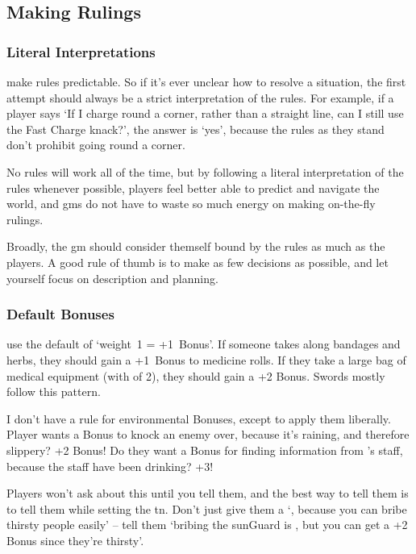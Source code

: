 \begin{multicols}{2}
\subsection{Making Rulings}

\subsubsection{Literal Interpretations}
make rules predictable.
So if it's ever unclear how to resolve a situation, the first attempt should always be a strict interpretation of the rules.
For example, if a player says `If I charge round a corner, rather than a straight line, can I still use the Fast Charge knack?', the answer is `yes', because the rules as they stand don't prohibit going round a corner.

No rules will work all of the time, but by following a literal interpretation of the rules whenever possible, players feel better able to predict and navigate the world, and \glspl{gm} do not have to waste so much energy on making on-the-fly rulings.

Broadly, the \gls{gm} should consider themself bound by the rules as much as the players.
A good rule of thumb is to make as few decisions as possible, and let yourself focus on description and planning.

\subsubsection{Default Bonuses}
use the default of `\gls{weight}~1 = +1~Bonus'.
If someone takes along bandages and herbs, they should gain a +1~Bonus to medicine rolls.
If they take a large bag of medical equipment (with  of 2), they should gain a +2 Bonus.
Swords mostly follow this pattern.

I don't have a rule for environmental Bonuses, except to apply them liberally.
Player wants a Bonus to knock an enemy over, because it's raining, and therefore slippery?
+2 Bonus!
Do they want a Bonus for finding information from 's staff, because the staff have been drinking?
+3!

Players won't ask about this until you tell them, and the best way to tell them is to tell them while setting the \gls{tn}.
Don't just give them a `\tn[8], because you can bribe thirsty people easily' -- tell them `bribing the \gls{sunGuard} is \tn[10], but you can get a +2 Bonus since they're thirsty'.


\end{multicols}
